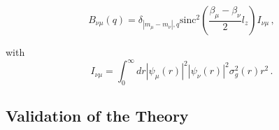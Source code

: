 \documentclass[aps,prl,twocolumn, amsmath,amssymb,superscriptaddress]{revtex4-2}
\begin{document}
\begin{equation}
   B_{\nu\mu}(q) = 
        \delta_{|m_\mu-m_\nu|,q} 
        \text{sinc}^2\left(\frac{\beta_\mu-\beta_\nu}{2}
    l_z
    \right)
        I_{\nu\mu} \, ,
    \label{eq:coupling}
\end{equation}

with 
\begin{equation}
I_{\nu\mu} = 
    \int_0^\infty dr 
        \left|\psi_\mu(r)\right|^2 
        \left|\psi_\nu(r)\right|^2 
        \sigma^2_g(r) r^2 \, .
\end{equation}



\subsection*{Validation of the Theory}
\end{document}

